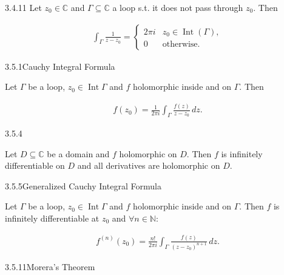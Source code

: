 \documentclass[10pt,landscape]{article}
\DeclareMathOperator{\Int}{Int}
\begin{document}
\begin{multicols}{3}
\begin{theorem}{3.4.11}{}
    Let $z_0 \in \mathbb{C}$ and $\Gamma \subseteq \mathbb{C}$ a loop s.t. it does not pass through $z_0$. Then

        \begin{align*}
            \int_{\Gamma} \frac{1}{z - z_0} =
                \begin{cases}
                    2 \pi i & z_0 \in \Int(\Gamma), \\
                    0 & \mathrm{otherwise}.
                \end{cases}
        \end{align*}

\end{theorem}

\begin{theorem}{3.5.1}{Cauchy Integral Formula}

    Let $\Gamma$ be a loop, $z_0 \in \Int{\Gamma}$ and $f$ holomorphic inside and on $\Gamma$. Then

        \begin{align*}
            f(z_0) = \frac{1}{2\pi i} \int_{\Gamma} \frac{f(z)}{z - z_0} \,dz.
        \end{align*}

\end{theorem}

\begin{corollary}{3.5.4}{}

    Let $D \subseteq \mathbb{C}$ be a domain and $f$ holomorphic on $D$. Then $f$ is infinitely differentiable on $D$ and all derivatives are holomorphic on $D$.

\end{corollary}

\begin{theorem}{3.5.5}{Generalized Cauchy Integral Formula}

    Let $\Gamma$ be a loop, $z_0 \in \Int{\Gamma}$ and $f$ holomorphic inside and on $\Gamma$. Then $f$ is infinitely differentiable at $z_0$ and $\forall n \in \mathbb{N}$:

        \begin{align*}
            f^{(n)}(z_0) = \frac{n!}{2\pi i} \int_{\Gamma} \frac{f(z)}{(z - z_0)^{n+1}} \,dz.
        \end{align*}

\end{theorem}

\begin{theorem}{3.5.11}{Morera's Theorem}


\end{theorem}
\end{multicols}
\end{document}
